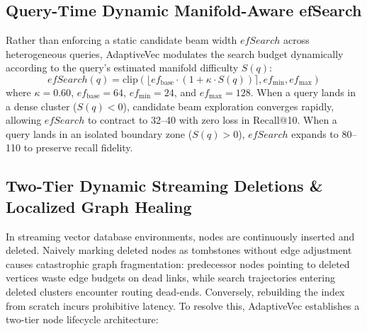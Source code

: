 \documentclass[conference,10pt]{IEEEtran}
\begin{document}
\subsection{Query-Time Dynamic Manifold-Aware efSearch}
Rather than enforcing a static candidate beam width $efSearch$ across heterogeneous queries, AdaptiveVec modulates the search budget dynamically according to the query's estimated manifold difficulty $S(q)$:
\begin{equation}
efSearch(q) = \text{clip}\left( \lfloor ef_{\text{base}} \cdot (1 + \kappa \cdot S(q)) \rceil, ef_{\text{min}}, ef_{\text{max}} \right)
\end{equation}
where $\kappa = 0.60$, $ef_{\text{base}} = 64$, $ef_{\text{min}} = 24$, and $ef_{\text{max}} = 128$. When a query lands in a dense cluster ($S(q) < 0$), candidate beam exploration converges rapidly, allowing $efSearch$ to contract to 32--40 with zero loss in Recall@10. When a query lands in an isolated boundary zone ($S(q) > 0$), $efSearch$ expands to 80--110 to preserve recall fidelity.

\subsection{Two-Tier Dynamic Streaming Deletions \& Localized Graph Healing}
In streaming vector database environments, nodes are continuously inserted and deleted. Naively marking deleted nodes as tombstones without edge adjustment causes catastrophic graph fragmentation: predecessor nodes pointing to deleted vertices waste edge budgets on dead links, while search trajectories entering deleted clusters encounter routing dead-ends. Conversely, rebuilding the index from scratch incurs prohibitive latency. To resolve this, AdaptiveVec establishes a two-tier node lifecycle architecture:
\end{document}
